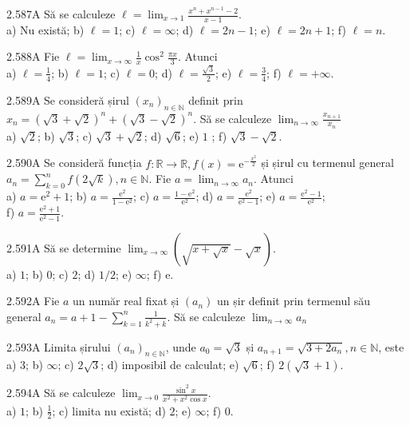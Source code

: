 \documentclass[11pt]{article}
\begin{document}
2.587A Să se calculeze $\ell=\lim _{x \rightarrow 1} \frac{x^{n}+x^{n-1}-2}{x-1}$.\\ a) $\mathrm{Nu}$ există; b) $\ell=1$; c) $\ell=\infty$; d) $\ell=2 n-1$; e) $\ell=2 n+1$; f) $\ell=n$.

2.588A Fie $\ell=\lim _{x \rightarrow \infty} \frac{1}{x} \cos ^{2} \frac{\pi x}{3}$. Atunci\\ a) $\ell=\frac{1}{4}$; b) $\ell=1$; c) $\ell=0$; d) $\ell=\frac{\sqrt{3}}{2}$; e) $\ell=\frac{3}{4}$; f) $\ell=+\infty$.

2.589A Se consideră șirul $\left(x_{n}\right)_{n \in \mathbb{N}}$ definit prin $x_{n}=(\sqrt{3}+\sqrt{2})^{n}+(\sqrt{3}-\sqrt{2})^{n}$. Să se calculeze $\lim _{n \rightarrow \infty} \frac{x_{n+1}}{x_{n}}$\\ a) $\sqrt{2}$; b) $\sqrt{3}$; c) $\sqrt{3}+\sqrt{2}$; d) $\sqrt{6}$; e) $1$ ; f) $\sqrt{3}-\sqrt{2}$.

2.590A Se consideră funcția $f: \mathbb{R} \rightarrow \mathbb{R}, f(x)=\mathrm{e}^{-\frac{x^{2}}{2}}$ și șirul cu termenul general $a_{n}=\sum_{k=0}^{n} f(2 \sqrt{k}), n \in \mathbb{N}$. Fie $a=\lim _{n \rightarrow \infty} a_{n}$. Atunci\\ a) $a=\mathrm{e}^{2}+1$; b) $a=\frac{\mathrm{e}^{2}}{1-\mathrm{e}^{2}}$; c) $a=\frac{1-\mathrm{e}^{2}}{\mathrm{e}^{2}}$; d) $a=\frac{\mathrm{e}^{2}}{\mathrm{e}^{2}-1}$; e) $a=\frac{\mathrm{e}^{2}-1}{\mathrm{e}^{2}}$;\\ f) $a=\frac{\mathrm{e}^{2}+1}{\mathrm{e}^{2}-1}$.

2.591A Să se determine $\lim _{x \rightarrow \infty}(\sqrt{x+\sqrt{x}}-\sqrt{x})$.\\ a) $1$; b) $0$; c) $2$; d) $1 / 2$; e) $\infty$; f) $\mathrm{e}$.

2.592A Fie $a$ un număr real fixat și $\left(a_{n}\right)$ un șir definit prin termenul său general $a_{n}=a+1-\sum_{k=1}^{n} \frac{1}{k^{2}+k}$. Să se calculeze $\lim _{n \rightarrow \infty} a_{n}$

2.593A Limita șirului $\left(a_{n}\right)_{n \in \mathbb{N}}$, unde $a_{0}=\sqrt{3}$ și $a_{n+1}=\sqrt{3+2 a_{n}}, n \in \mathbb{N}$, este\\ a) $3$; b) $\infty$; c) $2 \sqrt{3}$; d) imposibil de calculat; e) $\sqrt{6}$; f) $2(\sqrt{3}+1)$.

2.594A Să se calculeze $\lim _{x \rightarrow 0} \frac{\sin ^{2} x}{x^{2}+x^{2} \cos x}$.\\ a) $1$; b) $\frac{1}{2}$; c) limita nu există; d) $2$; e) $\infty$; f) $0$.
\end{document}
